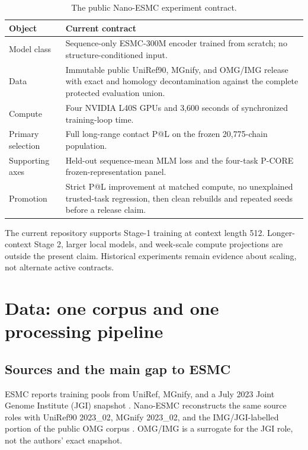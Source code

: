 \documentclass{article}
\begin{document}
\begin{table}[H]
  \centering
  \small
  \begin{tabularx}{\textwidth}{@{}p{}Y@{}}
    \toprule
    Object & Current contract \\
    \midrule
    Model class & Sequence-only ESMC-300M encoder trained from scratch; no structure-conditioned input. \\
    Data & Immutable public UniRef90, MGnify, and OMG/IMG release with exact and homology decontamination against the complete protected evaluation union. \\
    Compute & Four NVIDIA L40S GPUs and 3,600 seconds of synchronized training-loop time. \\
    Primary selection & Full long-range contact P@L on the frozen 20,775-chain population. \\
    Supporting axes & Held-out sequence-mean MLM loss and the four-task P-CORE frozen-representation panel. \\
    Promotion & Strict P@L improvement at matched compute, no unexplained trusted-task regression, then clean rebuilds and repeated seeds before a release claim. \\
    \bottomrule
  \end{tabularx}
  \caption{The public Nano-ESMC experiment contract.}
  \label{tab:contract}
\end{table}

The current repository supports Stage-1 training at context length 512.
Longer-context Stage 2, larger local models, and week-scale compute projections
are outside the present claim. Historical experiments remain evidence about
scaling, not alternate active contracts.

\section{Data: one corpus and one processing pipeline}
\label{sec:data}

\subsection{Sources and the main gap to ESMC}

ESMC reports training pools from UniRef, MGnify, and a July 2023 Joint Genome
Institute (JGI) snapshot \citep{candido2026language,suzek2015uniref,
richardson2023mgnify}. Nano-ESMC reconstructs the same source roles with
UniRef90 2023\_02, MGnify 2023\_02, and the IMG/JGI-labelled portion of the
public OMG corpus \citep{cornman2024omg}. OMG/IMG is a surrogate for the JGI
role, not the authors' exact snapshot.
\end{document}
